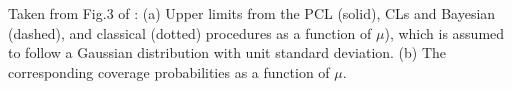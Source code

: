 Taken from Fig.3 of \cite{2011arXiv1105.3166C}: (a) Upper limits from the PCL (solid), CLs and Bayesian (dashed), and classical (dotted) procedures as a function of $\mu$), which is assumed to follow a Gaussian distribution with unit standard deviation. (b) The corresponding coverage probabilities as a function of $\mu$.